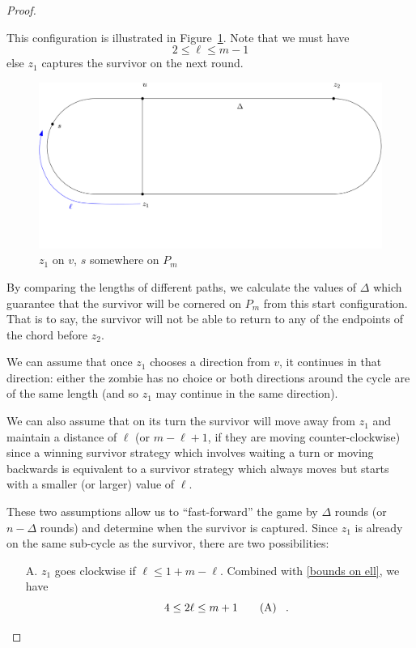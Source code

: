\begin{proof}
\begin{proofpart}
  This configuration is illustrated in Figure~\ref{fig:onthechord}.
  Note that we must have
  \[2 \leq \ell \leq m-1 \tag{1} \label{bounds on ell}\]
  else $z_1$ captures the survivor on the next round.

  \begin{figure}
    \centering
    \includegraphics{q_m_n/diagram1}
    \caption{$z_1$ on $v$, $s$ somewhere on $P_m$ \label{fig:onthechord}}
  \end{figure}

  By comparing the lengths of different paths, we calculate the values of $\Delta$
  which guarantee that the survivor will be cornered on $P_m$ from this start configuration. That is to say, the survivor will not be able to return to any of the endpoints of the chord before $z_2$.

  We can assume that once $z_1$ chooses a direction from $v$, it continues in that direction: either the zombie has no choice or both directions around the cycle are of the same length (and so
  $z_1$ may continue in the same direction).

  We can also assume that on its turn the survivor will move away from
  $z_1$ and maintain a distance of $\ell$ (or $m-\ell +1$, if they are moving counter-clockwise)
  since a winning survivor strategy which involves waiting a turn
  or moving backwards is equivalent to a survivor strategy
  which always moves but starts with a smaller (or larger) value of $\ell$.

  These two assumptions allow us to ``fast-forward'' the game by $\Delta$ rounds (or $n-\Delta$ rounds) and determine when the survivor is captured. Since $z_1$ is already on the same sub-cycle as the survivor, there are two possibilities:

  \begin{itemize}
   \item[A.] $z_1$ goes clockwise if $\ell \leq 1 + m - \ell$.
         Combined with \ref{bounds on ell}, we have
         \begin{equation}
           4 \leq 2 \ell \leq m + 1 \tag{A} \label{assumption a} \mperiod
         \end{equation}


\end{itemize}
\end{proofpart}
\end{proof}
